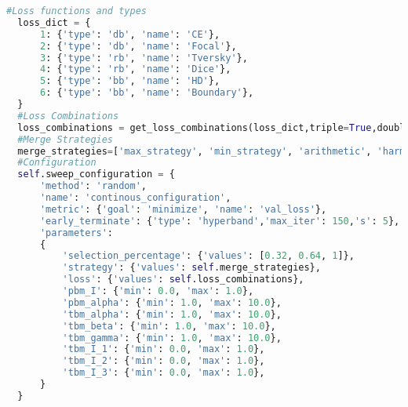 \begin{lstlisting}[style=mystyle,language=Python,numbers=none,caption={The \texttt{Time-based} configuration on the other hand is applied to all other merge strategies in combination with the 20 loss combinations as described in \chapref{chap:methodology}. As the parameters are also from a continuous space, the same Hyperband algorithm is used as described for the \texttt{Performance-based} configuration.}]
  #Loss functions and types
  loss_dict = {
      1: {'type': 'db', 'name': 'CE'},
      2: {'type': 'db', 'name': 'Focal'},
      3: {'type': 'rb', 'name': 'Tversky'},
      4: {'type': 'rb', 'name': 'Dice'},
      5: {'type': 'bb', 'name': 'HD'},
      6: {'type': 'bb', 'name': 'Boundary'},
  }
  #Loss Combinations
  loss_combinations = get_loss_combinations(loss_dict,triple=True,double=True,baseline=False)
  #Merge Strategies
  merge_strategies=['max_strategy', 'min_strategy', 'arithmetic', 'harmonic', 'weighted_sum', 'normalized_weighted_sum','performance_based_merging']
  #Configuration
  self.sweep_configuration = {
      'method': 'random',
      'name': 'continous_configuration',
      'metric': {'goal': 'minimize', 'name': 'val_loss'},
      'early_terminate': {'type': 'hyperband','max_iter': 150,'s': 5},
      'parameters':
      {   
          'selection_percentage': {'values': [0.32, 0.64, 1]},
          'strategy': {'values': self.merge_strategies},
          'loss': {'values': self.loss_combinations},
          'pbm_I': {'min': 0.0, 'max': 1.0},
          'pbm_alpha': {'min': 1.0, 'max': 10.0},
          'tbm_alpha': {'min': 1.0, 'max': 10.0},
          'tbm_beta': {'min': 1.0, 'max': 10.0},
          'tbm_gamma': {'min': 1.0, 'max': 10.0},
          'tbm_I_1': {'min': 0.0, 'max': 1.0},
          'tbm_I_2': {'min': 0.0, 'max': 1.0},
          'tbm_I_3': {'min': 0.0, 'max': 1.0},
      }
  }
\end{lstlisting}